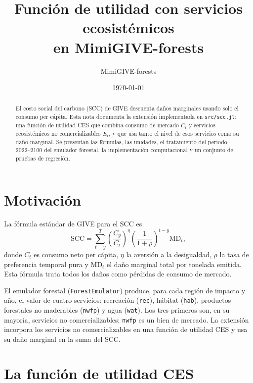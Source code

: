 \documentclass[11pt,a4paper]{article}
\title{Función de utilidad con servicios ecosistémicos\\
       en MimiGIVE-forests}
\author{MimiGIVE-forests}
\date{\today}
\begin{document}
\maketitle

\begin{abstract}
El costo social del carbono (SCC) de GIVE descuenta daños marginales usando
solo el consumo per cápita. Esta nota documenta la extensión implementada en
\texttt{src/scc.jl}: una función de utilidad CES que combina consumo de mercado
\(C_t\) y servicios ecosistémicos no comercializables \(E_t\), y que usa tanto
el nivel de esos servicios como su daño marginal. Se presentan las fórmulas,
las unidades, el tratamiento del periodo 2022--2100 del emulador forestal, la
implementación computacional y un conjunto de pruebas de regresión.
\end{abstract}

\tableofcontents

\section{Motivación}

La fórmula estándar de GIVE para el SCC es
\begin{equation}
  \mathrm{SCC} =
  \sum_{t=y}^{T} \left(\frac{C_y}{C_t}\right)^{\eta}
  \left(\frac{1}{1+\rho}\right)^{t-y} \mathrm{MD}_{t},
  \label{eq:scc-original}
\end{equation}
donde \(C_t\) es consumo neto per cápita, \(\eta\) la aversión a la
desigualdad, \(\rho\) la tasa de preferencia temporal pura y
\(\mathrm{MD}_t\) el daño marginal total por tonelada emitida. Esta fórmula
trata todos los daños como pérdidas de consumo de mercado.

El emulador forestal (\texttt{ForestEmulator}) produce, para cada región de
impacto y año, el valor de cuatro servicios: recreación (\texttt{rec}),
hábitat (\texttt{hab}), productos forestales no maderables (\texttt{nwfp}) y
agua (\texttt{wat}). Los tres primeros son, en su mayoría, servicios no
comercializables; \texttt{nwfp} es un bien de mercado. La extensión incorpora
los servicios no comercializables en una función de utilidad CES y usa su daño
marginal en la suma del SCC.

\section{La función de utilidad CES}
\end{document}
